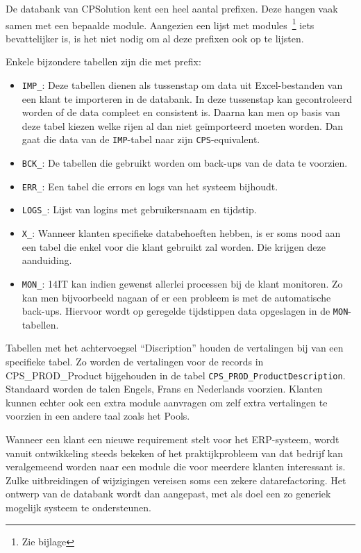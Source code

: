 De databank van CPSolution kent een heel aantal prefixen. Deze hangen vaak samen met een bepaalde module. Aangezien een lijst met modules~\footnote{Zie bijlage} iets bevattelijker is, is het niet nodig om al deze prefixen ook op te lijsten.

Enkele bijzondere tabellen zijn die met prefix:
\begin{itemize}
	\item \verb*|IMP_|: Deze tabellen dienen als tussenstap om data uit Excel-bestanden van een klant te importeren in de databank. In deze tussenstap kan gecontroleerd worden of de data compleet en consistent is. Daarna kan men op basis van deze tabel kiezen welke rijen al dan niet geïmporteerd moeten worden. Dan gaat die data van de \verb*|IMP|-tabel naar zijn \verb*|CPS|-equivalent.
	\item \verb*|BCK_|: De tabellen die gebruikt worden om back-ups van de data te voorzien.
	\item \verb*|ERR_|: Een tabel die errors en logs van het systeem bijhoudt.
	\item \verb*|LOGS_|: Lijst van logins met gebruikersnaam en tijdstip.
	\item \verb*|X_|: Wanneer klanten specifieke databehoeften hebben, is er soms nood aan een tabel die enkel voor die klant gebruikt zal worden. Die krijgen deze aanduiding.
	\item \verb*|MON_|: 14IT kan indien gewenst allerlei processen bij de klant monitoren. Zo kan men bijvoorbeeld nagaan of er een probleem is met de automatische back-ups. Hiervoor wordt op geregelde tijdstippen data opgeslagen in de \verb*|MON|-tabellen. 
\end{itemize}

Tabellen met het achtervoegsel ``Discription'' houden de vertalingen bij van een specifieke tabel. Zo worden de vertalingen voor de records in CPS\_PROD\_Product bijgehouden in de tabel \verb*|CPS_PROD_ProductDescription|. Standaard worden de talen Engels, Frans en Nederlands voorzien. Klanten kunnen echter ook een extra module aanvragen om zelf extra vertalingen te voorzien in een andere taal zoals het Pools.

Wanneer een klant een nieuwe requirement stelt voor het ERP-systeem, wordt vanuit ontwikkeling steeds bekeken of het praktijkprobleem van dat bedrijf kan veralgemeend worden naar een module die voor meerdere klanten interessant is. Zulke uitbreidingen of wijzigingen vereisen soms een zekere datarefactoring. Het ontwerp van de databank wordt dan aangepast, met als doel een zo generiek mogelijk systeem te ondersteunen. 


